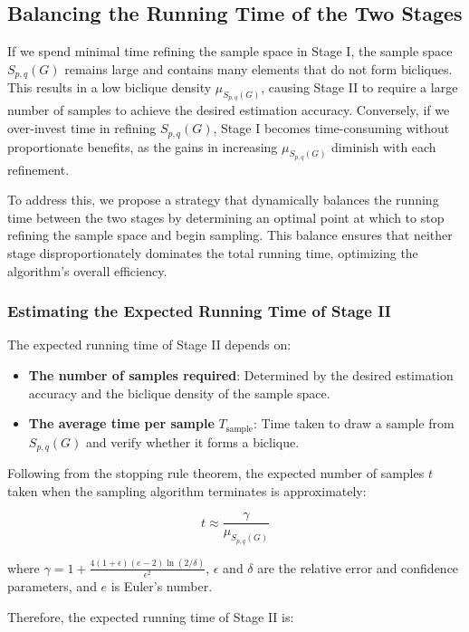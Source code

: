 \subsection{Balancing the Running Time of the Two Stages}



If we spend minimal time refining the sample space in Stage I, the sample space $ S_{p,q}(G) $ remains large and contains many elements that do not form bicliques. This results in a low biclique density $ \mu_{S_{p,q}(G)} $, causing Stage II to require a large number of samples to achieve the desired estimation accuracy. Conversely, if we over-invest time in refining $ S_{p,q}(G) $, Stage I becomes time-consuming without proportionate benefits, as the gains in increasing $ \mu_{S_{p,q}(G)} $ diminish with each refinement.

To address this, we propose a strategy that dynamically balances the running time between the two stages by determining an optimal point at which to stop refining the sample space and begin sampling. This balance ensures that neither stage disproportionately dominates the total running time, optimizing the algorithm's overall efficiency.

\subsubsection{Estimating the Expected Running Time of Stage II}

The expected running time of Stage II depends on:
\begin{itemize}
	\item \textbf{The number of samples required}: Determined by the desired estimation accuracy and the biclique density of the sample space.
	\item \textbf{The average time per sample} $ T_{\text{sample}} $: Time taken to draw a sample from $ S_{p,q}(G) $ and verify whether it forms a biclique.
\end{itemize}

Following from the stopping rule theorem, the expected number of samples $ t $ taken when the sampling algorithm terminates is approximately:

\[
t \approx \frac{\gamma}{\mu_{S_{p,q}(G)}}
\]

where $ \gamma = 1 + \frac{4(1+\epsilon)(e - 2)\ln(2/\delta)}{\epsilon^2} $, $ \epsilon $ and $ \delta $ are the relative error and confidence parameters, and $ e $ is Euler's number.

Therefore, the expected running time of Stage II is:

